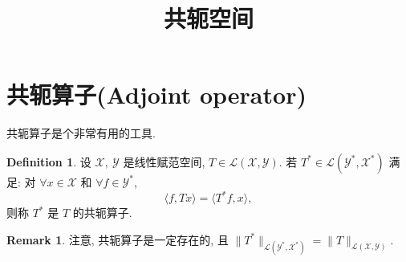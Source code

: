\documentclass[a4paper,11pt]{article}
\title{共轭空间}
\theoremstyle{definition}
\newtheorem{remark}[theorem]{Remark}
\newtheorem{definition}[theorem]{Definition}
\begin{document}
\maketitle

\section{共轭算子(Adjoint operator)}

共轭算子是个非常有用的工具.

\begin{definition}
    设 $ \mathcal{X},\ \mathcal{Y} $ 是线性赋范空间, $ T \in \mathscr{L}(\mathcal{X}, \mathcal{Y}) $.
    若 $ T^* \in \mathscr{L}(\mathcal{Y}^*, \mathcal{X}^*) $ 满足: 
    对 $ \forall x \in \mathcal{X} $ 和 $ \forall f \in \mathcal{Y}^* $,
    $$
        \langle f, Tx \rangle = \langle T^* f, x \rangle,
    $$
    则称 $ T^* $ 是 $ T $ 的共轭算子.
\end{definition}

\begin{remark}
    注意, 共轭算子是一定存在的, 且 
    $ \| T^* \|_{\mathscr{L}(\mathcal{Y}^*, \mathcal{X}^*)} = \| T \|_{\mathscr{L}(\mathcal{X}, \mathcal{Y})} $.
\end{remark}
\end{document}
